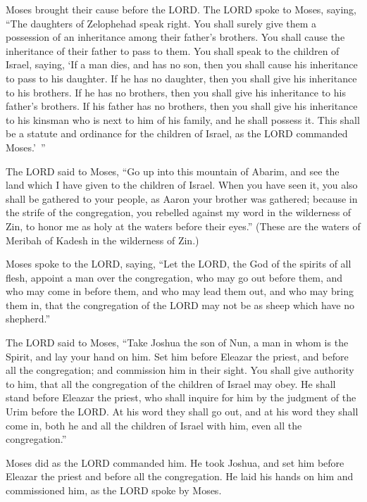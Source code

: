 \myverse{}Moses brought their cause before the LORD.
\myverse{}The LORD spoke to Moses, saying,
\myverse{}“The daughters of Zelophehad speak right. You shall surely give them a possession
of an inheritance among their father’s brothers. You shall cause the inheritance of their father to pass
to them.
\myverse{}You shall speak to the children of Israel, saying, ‘If a man dies, and has
no son, then you shall cause his inheritance to pass to his daughter.
\myverse{}If he has no daughter, then you shall give his inheritance to his brothers.
\myverse{}If he has no brothers, then you shall give his inheritance to his father’s
brothers.
\myverse{}If his father has no brothers, then you shall give his inheritance to his
kinsman who is next to him of his family, and he shall possess it. This shall be a statute and ordinance
for the children of Israel, as the LORD commanded Moses.’ ”


\myverse{}The LORD said to Moses, “Go up into this mountain of Abarim,
and see the land which I have given to the children of Israel.
\myverse{}When you have seen it, you also shall be gathered to your people, as Aaron
your brother was gathered;
\myverse{}because in the strife of the congregation, you rebelled against my word in
the wilderness of Zin, to honor me as holy at the waters before their eyes.” (These are the waters of
Meribah of Kadesh in the wilderness of Zin.)


\myverse{}Moses spoke to the LORD, saying,
\myverse{}“Let the LORD, the God of the spirits of all flesh, appoint a man over the
congregation,
\myverse{}who may go out before them, and who may come in before them, and who may
lead them out, and who may bring them in, that the congregation of the LORD may not be as sheep which
have no shepherd.”


\myverse{}The LORD said to Moses, “Take Joshua the son of Nun, a man in
whom is the Spirit, and lay your hand on him.
\myverse{}Set him before Eleazar the priest, and before all the congregation; and commission
him in their sight.
\myverse{}You shall give authority to him, that all the congregation of the children
of Israel may obey.
\myverse{}He shall stand before Eleazar the priest, who shall inquire for him by the
judgment of the Urim before the LORD. At his word they shall go out, and at his word they shall come in,
both he and all the children of Israel with him, even all the congregation.”


\myverse{}Moses did as the LORD commanded him. He took Joshua, and set
him before Eleazar the priest and before all the congregation.
\myverse{}He laid his hands on him and commissioned him, as the LORD spoke by Moses.


